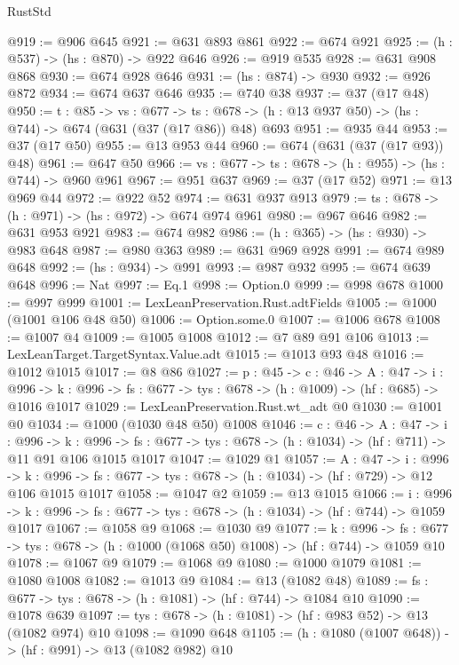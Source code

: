 \begin{lexlean}{RustStd}
\begin{coremodule}
@919 := @906 @645
@921 := @631 @893 @861
@922 := @674 @921
@925 := (h : @537) -> (hs : @870) -> @922 @646
@926 := @919 @535
@928 := @631 @908 @868
@930 := @674 @928 @646
@931 := (hs : @874) -> @930
@932 := @926 @872
@934 := @674 @637 @646
@935 := @740 @38
@937 := @37 (@17 @48)
@950 := {t : @85} ->
  {vs : @677} ->
  {ts : @678} -> (h : @13 @937 @50) -> (hs : @744) -> @674 (@631 (@37 (@17 @86)) @48) @693
@951 := @935 @44
@953 := @37 (@17 @50)
@955 := @13 @953 @44
@960 := @674 (@631 (@37 (@17 @93)) @48)
@961 := @647 @50
@966 := {vs : @677} -> {ts : @678} -> (h : @955) -> (hs : @744) -> @960 @961
@967 := @951 @637
@969 := @37 (@17 @52)
@971 := @13 @969 @44
@972 := @922 @52
@974 := @631 @937 @913
@979 := {ts : @678} -> (h : @971) -> (hs : @972) -> @674 @974 @961
@980 := @967 @646
@982 := @631 @953 @921
@983 := @674 @982
@986 := (h : @365) -> (hs : @930) -> @983 @648
@987 := @980 @363
@989 := @631 @969 @928
@991 := @674 @989 @648
@992 := (hs : @934) -> @991
@993 := @987 @932
@995 := @674 @639 @648
@996 := Nat
@997 := Eq.{1}
@998 := Option.{0}
@999 := @998 @678
@1000 := @997 @999
@1001 := LexLeanPreservation.Rust.adtFields
@1005 := @1000 (@1001 @106 @48 @50)
@1006 := Option.some.{0}
@1007 := @1006 @678
@1008 := @1007 @4
@1009 := @1005 @1008
@1012 := @7 @89 @91 @106
@1013 := LexLeanTarget.TargetSyntax.Value.adt
@1015 := @1013 @93 @48
@1016 := @1012 @1015
@1017 := @8 @86
@1027 := {p : @45} ->
  {c : @46} ->
  {A : @47} ->
  {i : @996} ->
  {k : @996} -> {fs : @677} -> {tys : @678} -> (h : @1009) -> (hf : @685) -> @1016 @1017
@1029 := LexLeanPreservation.Rust.wt_adt @0
@1030 := @1001 @0
@1034 := @1000 (@1030 @48 @50) @1008
@1046 := {c : @46} ->
  {A : @47} ->
  {i : @996} ->
  {k : @996} ->
  {fs : @677} -> {tys : @678} -> (h : @1034) -> (hf : @711) -> @11 @91 @106 @1015 @1017
@1047 := @1029 @1
@1057 := {A : @47} ->
  {i : @996} ->
  {k : @996} -> {fs : @677} -> {tys : @678} -> (h : @1034) -> (hf : @729) -> @12 @106 @1015 @1017
@1058 := @1047 @2
@1059 := @13 @1015
@1066 := {i : @996} ->
  {k : @996} -> {fs : @677} -> {tys : @678} -> (h : @1034) -> (hf : @744) -> @1059 @1017
@1067 := @1058 @9
@1068 := @1030 @9
@1077 := {k : @996} ->
  {fs : @677} -> {tys : @678} -> (h : @1000 (@1068 @50) @1008) -> (hf : @744) -> @1059 @10
@1078 := @1067 @9
@1079 := @1068 @9
@1080 := @1000 @1079
@1081 := @1080 @1008
@1082 := @1013 @9
@1084 := @13 (@1082 @48)
@1089 := {fs : @677} -> {tys : @678} -> (h : @1081) -> (hf : @744) -> @1084 @10
@1090 := @1078 @639
@1097 := {tys : @678} -> (h : @1081) -> (hf : @983 @52) -> @13 (@1082 @974) @10
@1098 := @1090 @648
@1105 := (h : @1080 (@1007 @648)) -> (hf : @991) -> @13 (@1082 @982) @10

\end{coremodule}
\end{lexlean}
